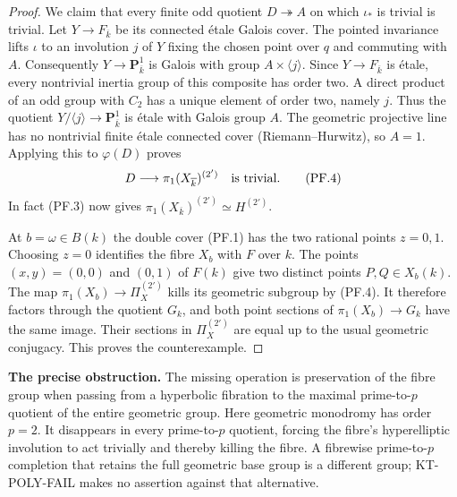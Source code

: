 \documentclass[11pt,a4paper]{article}
\theoremstyle{definition}
\renewcommand{\paragraph}[1]{\par\smallskip\noindent\textbf{#1}\quad\ignorespaces}
\begin{document}
\begin{proof}
We claim that every finite odd quotient $D\twoheadrightarrow A$
on which $\iota_*$ is trivial is trivial. Let $Y\to F_{\overline k}$
be its connected \'etale Galois cover. The pointed invariance
lifts $\iota$ to an involution $j$ of $Y$ fixing the chosen point
over $q$ and commuting with $A$. Consequently
$Y\to\mathbf P^1_{\overline k}$ is Galois with group
$A\times\langle j\rangle$. Since $Y\to F_{\overline k}$ is
\'etale, every nontrivial inertia group of this composite has
order two. A direct product of an odd group with $C_2$ has a
unique element of order two, namely $j$. Thus the quotient
$Y/\langle j\rangle\to\mathbf P^1_{\overline k}$ is \'etale
with Galois group $A$. The geometric projective line has no
nontrivial finite \'etale connected cover (Riemann--Hurwitz),
so $A=1$. Applying this to $\varphi(D)$ proves
\[
 D\longrightarrow\pi_1(X_{\overline k})^{(2')}
 \quad\hbox{is trivial}.                                  \tag{PF.4}
\]
In fact (PF.3) now gives
$\pi_1(X_{\overline k})^{(2')}\simeq H^{(2')}$.

At $b=\omega\in B(k)$ the double cover (PF.1) has the two
rational points $z=0,1$. Choosing $z=0$ identifies the fibre
$X_b$ with $F$ over $k$. The points $(x,y)=(0,0)$ and $(0,1)$
of $F(k)$ give two distinct points $P,Q\in X_b(k)$.
The map $\pi_1(X_b)\to\Pi_X^{(2')}$ kills its geometric
subgroup by (PF.4). It therefore factors through the quotient
$G_k$, and both point sections of $\pi_1(X_b)\to G_k$ have
the same image. Their sections in $\Pi_X^{(2')}$ are equal
up to the usual geometric conjugacy. This proves the
counterexample.
\end{proof}

\paragraph{The precise obstruction.}
The missing operation is preservation of the fibre group when
passing from a hyperbolic fibration to the maximal prime-to-$p$
quotient of the entire geometric group. Here geometric monodromy
has order $p=2$. It disappears in every prime-to-$p$ quotient,
forcing the fibre's hyperelliptic involution to act trivially and
thereby killing the fibre. A fibrewise prime-to-$p$ completion
that retains the full geometric base group is a different group;
KT-POLY-FAIL makes no assertion against that alternative.




\end{document}
